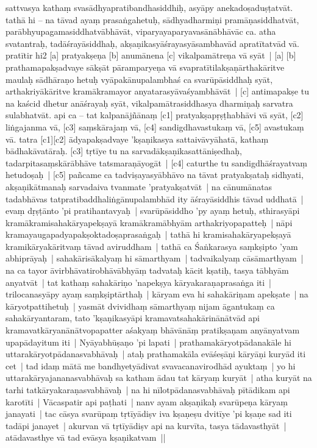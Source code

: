 \documentclass[article,12pt,a4paper]{memoir}
\newcommand{\persName}[1]{#1}
\begin{document}
sattvasya kathaṃ svasādhyapratibandhasiddhiḥ, asyāpy anekadoṣaduṣṭatvāt. tathā hi – na tāvad ayaṃ prasaṅgahetuḥ, sādhyadharmiṇi pramāṇasiddhatvāt, parābhyupagamasiddhatvābhāvāt, viparyayaparyavasānābhāvāc ca. atha svatantraḥ, tadāśrayāsiddhaḥ, akṣaṇikasyāśrayasyāsambhavād apratītatvād vā. pratītir hi2 [a] pratyakṣeṇa [b] anumānena [c] vikalpamātreṇa vā syāt | \label{thakur75-85.6} [a] [b] prathamapakṣadvaye sākṣāt pāramparyeṇa vā svapratītilakṣaṇārthakāritve maulaḥ sādhāraṇo hetuḥ vyāpakānupalambhaś ca svarūpāsiddhaḥ syāt, arthakriyākāritve kramākramayor anyatarasyāvaśyambhāvāt | \label{thakur75-85.8} [c] antimapakṣe tu na kaścid dhetur anāśrayaḥ syāt, vikalpamātrasiddhasya dharmiṇaḥ sarvatra sulabhatvāt. \label{thakur75-85.10} api ca – tat kalpanājñānaṃ [c1] pratyakṣapṛṣṭhabhāvi vā syāt, [c2] liṅgajanma vā, [c3] saṃskārajaṃ vā, [c4] sandigdhavastukaṃ vā, [c5] avastukaṃ vā. \label{thakur75-85.12} tatra [c1][c2] ādyapakṣadvaye 'kṣaṇikasya sattaivāvyāhatā, kathaṃ bādhakāvatāraḥ. \label{thakur75-85.12a} [c3] tṛtīye tu na sarvadākṣaṇikasattāniṣedhaḥ, tadarpitasaṃskārābhāve tatsmaraṇāyogāt | \label{thakur75-85.13} [c4] caturthe tu sandigdhāśrayatvaṃ hetudoṣaḥ | \label{thakur75-85.14} [c5] pañcame ca tadviṣayasyābhāvo na tāvat pratyakṣataḥ sidhyati, akṣaṇikātmanaḥ sarvadaiva tvanmate 'pratyakṣatvāt | na cānumānatas tadabhāvas tatpratibaddhaliṅgānupalambhād ity āśrayāsiddhis tāvad uddhatā | evaṃ dṛṣṭānto 'pi pratihantavyaḥ | \label{thakur75-85.18} svarūpāsiddho 'py ayaṃ hetuḥ, sthirasyāpi kramākramisahakāryapekṣayā kramākramābhyām arthakriyopapatteḥ | nāpi kramayaugapadyapakṣoktadoṣaprasaṅgaḥ | tathā hi kramisahakāryapekṣayā kramikāryakāritvaṃ tāvad aviruddham | \label{thakur75-85.21} tathā ca Śaṅkarasya saṃkṣipto 'yam abhiprāyaḥ | sahakārisākalyaṃ hi sāmarthyam | tadvaikalyaṃ cāsāmarthyam | na ca tayor āvirbhāvatirobhāvābhyāṃ tadvataḥ kācit kṣatiḥ, tasya tābhyām anyatvāt | tat kathaṃ sahakāriṇo 'napekṣya kāryakaraṇaprasaṅga iti | \label{thakur75-85.25} \persName{trilocanasyā}py ayaṃ saṃkṣiptārthaḥ | kāryam eva hi sahakāriṇam apekṣate | na kāryotpattihetuḥ | yasmāt dvividhaṃ sāmarthyaṃ nijam āgantukaṃ ca sahakāryantaram, tato 'kṣaṇikasyāpi kramavatsahakārinānātvād api kramavatkāryanānātvopapatter aśakyaṃ bhāvānāṃ pratikṣaṇam anyānyatvam upapādayitum iti | \label{thakur75-85.29} Nyāyabhūṣaṇo 'pi lapati | prathamakāryotpādanakāle hi uttarakāryotpādanasvabhāvaḥ | ataḥ prathamakāla evāśeṣāṇi kāryāṇi kuryād iti cet | \label{thakur75-85.30} tad idaṃ mātā me bandhyetyādivat svavacanavirodhād ayuktaṃ | yo hi uttarakāryajananasvabhāvaḥ sa katham ādau tat kāryaṃ kuryāt | atha kuryāt na tarhi tatkāryakaraṇasvabhāvaḥ | na hi nīlotpādanasvabhāvaḥ pītādikam api karotīti | \label{thakur75-86.3} Vācaspatir api paṭhati | nanv ayam akṣaṇikaḥ svarūpeṇa kāryaṃ janayati | tac cāsya svarūpaṃ tṛtīyādiṣv iva kṣaṇeṣu dvitīye 'pi kṣaṇe sad iti tadāpi janayet | akurvan vā tṛtīyādiṣv api na kurvīta, tasya tādavasthyāt | atādavasthye vā tad evāsya kṣaṇikatvam || \label{thakur75-86.7} 
\end{document}

